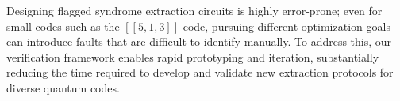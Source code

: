 \documentclass[acmsmall,screen,review,anonymous,nonacm]{acmart}
\begin{document}
Designing flagged syndrome extraction circuits is highly error-prone; even for small codes such as the $[[5,1,3]]$ code, pursuing different optimization goals can introduce faults that are difficult to identify manually. To address this, our verification framework enables rapid prototyping and iteration, substantially reducing the time required to develop and validate new extraction protocols for diverse quantum codes.
\begin{figure}[h]
\centering

\begin{subfigure}{0.48\linewidth}
\centering
{}
\caption{}
\label{fig:left-circuit-ld}
\end{subfigure}%
\hfill
\begin{subfigure}{0.48\linewidth}
\centering
\scalebox{0.7}{
\begin{quantikz}[row sep={1cm,between origins}, column sep=0.45cm]

\end{quantikz}}
\end{subfigure}
\end{figure}
\end{document}
